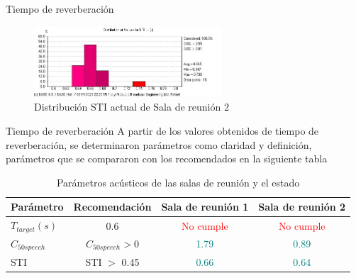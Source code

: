 \documentclass{sintefbeamer}
\begin{document}
\begin{frame}{Tiempo de reverberación}
    \begin{figure}
        \centering
        \includegraphics[width=7cm]{images/STI actual/STIdist_Reunion1_SinAcond.jpg}
        \caption{Distribución STI actual de Sala de reunión 2}
        \label{fig:distribución STI actual sala reunion 2}
    \end{figure}
\end{frame}

\begin{frame}{Tiempo de reverberación}
A partir de los valores obtenidos de tiempo de reverberación, se determinaron parámetros como claridad y definición, parámetros que se compararon con los recomendados en la siguiente tabla
     \begin{table}[H]
        \centering
        \caption{Parámetros acústicos de las salas de reunión y el estado}
        \label{tab: cumplimiento parametros RT de salas de reunión}
        \begin{tabular}{|l|c|c|c|}
        \hline
          \textbf{Parámetro}  & \textbf{Recomendación} & \textbf{Sala de reunión 1} & \textbf{Sala de reunión 2}\\ \hline
          $T_{target} (s)$ & 0.6 & \textcolor{red}{No cumple} & \textcolor{red}{No cumple}\\ \hline
          $C_{50speech}$ & $C_{50speech}>0$ & \textcolor{teal}{1.79} & \textcolor{teal}{0.89} \\ \hline
          STI& STI $>$ 0.45 & \textcolor{teal}{0.66} & \textcolor{teal}{0.64}\\\hline
        \end{tabular}
        
    \end{table}
\end{frame}
\end{document}
